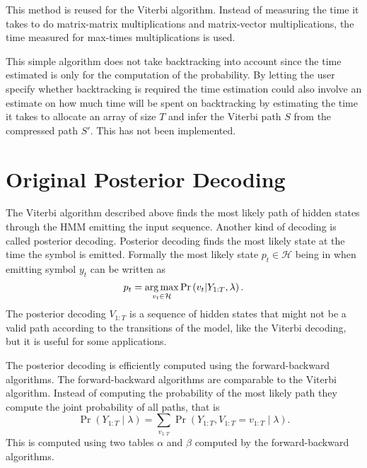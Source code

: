 This method is reused for the Viterbi algorithm. Instead of measuring the
time it takes to do matrix-matrix multiplications and matrix-vector
multiplications, the time measured for max-times multiplications is used.

This simple algorithm does not take backtracking into account since the time
estimated is only for the computation of the probability. By letting the user
specify whether backtracking is required the time estimation could also
involve an estimate on how much time will be spent on backtracking by
estimating the time it takes to allocate an array of size $T$ and
infer the Viterbi path $S$ from the compressed path $S'$. This has
not been implemented.

\section{Original Posterior Decoding}
\label{sec:posterior-decoding-1}

The Viterbi algorithm described above finds the most likely path of hidden
states through the HMM emitting the input sequence. Another kind of decoding is
called posterior decoding. Posterior decoding finds the most likely state at
the time the symbol is emitted. Formally the most likely state
$p_t \in \mathcal{H}$ being in when emitting symbol $y_t$ can be written as
\begin{equation*}
  p_t = \operatorname*{arg\,max}_{v_t \in \mathcal{H}} \Pr \left(v_t | Y_{1:T}, \lambda \right).
\end{equation*}
The posterior decoding $V_{1:T}$ is a sequence of hidden states that might not
be a valid path according to the transitions of the model, like the Viterbi
decoding, but it is useful for some applications.

The posterior decoding is efficiently computed using the forward-backward
algorithms. The forward-backward algorithms are comparable to the Viterbi
algorithm. Instead of computing the probability of the most likely path they
compute the joint probability of all paths, that is
\begin{equation*}
  \Pr
  \left(
    Y_{1:T} \mid \lambda
  \right) = \sum_{v_{1:T}} \Pr
  \left(
    Y_{1:T}, V_{1:T} = v_{1:T} \mid \lambda
  \right).
\end{equation*}
This is computed using two tables $\alpha$ and $\beta$ computed by the
forward-backward algorithms.

